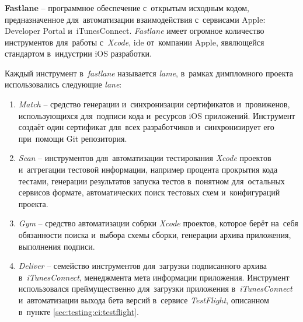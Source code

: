 \subsubsection{}
\label{sec:testing:ci:fastlane}

\textbf{Fastlane} -- программное обеспечение с~открытым исходным кодом, предназначенное для~автоматизации взаимодействия с~сервисами Apple: Developer Portal и~iTunesConnect. \textit{Fastlane} имеет огромное количество инструментов для~работы с~\textit{Xcode}, \gls{ide} от~компании Apple, явялющейся стандартом в~индустрии iOS разработки.

Каждый инструмент в~\textit{fastlane} называется \textit{lame}, в~рамках димпломного проекта использовались следующие \textit{lane}:

\begin{enumerate}
	\item \textit{Match} -- средство генерации и~синхронизации сертификатов и~провиженов, использующихся для~подписи кода и~ресурсов iOS приложений. Инструмент создаёт один сертификат для~всех разработчиков и~синхронизирует его при~помощи Git репозитория.
	\item \textit{Scan} -- инструментов для~автоматизации тестирования \textit{Xcode} проектов и~аггрегации тестовой информации, например процента прокрытия кода тестами, генерации результатов запуска тестов в~понятном для~остальных сервисов формате, автоматических поиск тестовых схем и~конфигураций проекта.
	\item \textit{Gym} -- средство автоматизации собрки \textit{Xcode} проектов, которое берёт на~себя обязанности поиска и~выбора схемы сборки, генерации архива приложения, выполнения подписи.
	\item \textit{Deliver} -- семейство инструментов для~загрузки подписанного архива в~\textit{iTunesConnect}, менеджмента мета информации приложения. Инструмент использовался преймущественно для~загрузки приложения в~\textit{iTunesConnect} и~автоматизации выхода бета версий в~сервисе \textit{TestFlight}, описанном в~пункте \ref{sec:testing:ci:testflight}.
\end{enumerate}